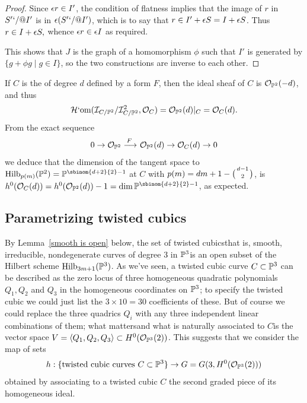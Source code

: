 \begin{proof}
Since ${\epsilon} r \in I'$, the condition of flatness implies
that the image of $r$ in $S'`/@I'$ is in ${\epsilon}(S'`/@I')$, which is to say
that $r \in I' + {\epsilon} S = I +{\epsilon} S$.
Thus $r \in  I + {\epsilon} S,$ whence ${\epsilon}  r \in {\epsilon} I$ as required.

This shows that
$J$ is the graph of a homomorphism $\phi$ such that
 $I'$ is generated by $\{g+\phi g\mid g\in I\}$, so the two constructions
 are inverse to
each other.
\end{proof}

\begin{example}
\label{Hilb for plane curves-continued}
If $C$ is the
%
of degree $d$ defined by a form $F$, then the
ideal sheaf of $C$ is ${\mathcal O}_{{\mathbb P}^2}(-d)$, and thus
$$
\operatorname{\mathcal H`om}(\mathcal I_{C/{\mathbb P}^2}/\mathcal I_{C/{\mathbb P}^2}^2, {\mathcal O}_{C}) = {\mathcal O}_{{\mathbb P}^2}(d)|_C =
{\mathcal O}_C(d).
$$
From the exact sequence
$$
0\to\sO_{\PP^2}\ruto {\,F}\sO_{\PP^2}(d) \to\sO_C(d)\to 0
$$
we deduce that the dimension of the tangent space to
$\Hilb_{p(m)}(\PP^2)=\PP^{\sbinom{d+2}{2}-1}$  at $C$
with $p(m) = dm+1-\tbinom{d-1}{ 2}$,
is $h^0(\sO_C(d)) = h^0(\sO_{\PP^2}(d))-1 = \dim \PP^{\sbinom{d+2}{2}-1}$,
as expected.
\meshing
\end{example}

\subsection{Parametrizing twisted cubics}

By Lemma~\ref{smooth is open}
below, the set of twisted cubics\emdash that is, smooth, irreducible,
nondegenerate curves of degree 3 in ${\mathbb P}^3$\emdash is an open subset
of the Hilbert scheme $\operatorname{Hilb}_{3m+1}({\mathbb P}^3)$. As we've seen, a twisted
%
cubic curve $C \subset {\mathbb P}^3$ can be described as the zero locus of
three homogeneous quadratic polynomials $Q_1, Q_2$ and $Q_3$ in the
homogeneous coordinates on ${\mathbb P}^3$; to specify the twisted cubic
we could just list the $3 \times 10 = 30$ coefficients of these. But
of course we could replace the three quadrics $Q_i$ with any three
independent linear combinations of them; what matters\emdash and what
is naturally associated to $C$\emdash is the vector space $V = \langle
Q_1, Q_2, Q_3 \rangle \subset H^0(\mathcal O_{{\mathbb P}^3}(2))$. This suggests that
we consider the map of sets
$$
h : \{ \text{twisted cubic curves } C \subset {\mathbb P}^3 \} \to G = G(3,
H^0(\mathcal O_{{\mathbb P}^3}(2)))
$$
obtained by associating to a twisted cubic $C$ the second graded piece
of its homogeneous ideal.

